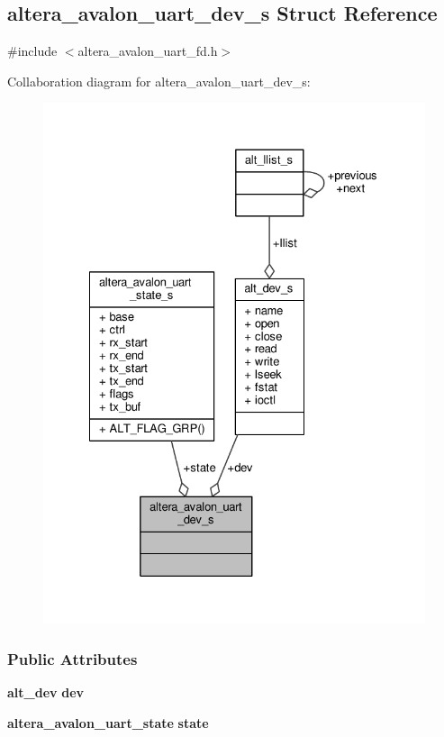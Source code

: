 \subsection{altera\+\_\+avalon\+\_\+uart\+\_\+dev\+\_\+s Struct Reference}
\label{structaltera__avalon__uart__dev__s}


{\ttfamily \#include $<$altera\+\_\+avalon\+\_\+uart\+\_\+fd.\+h$>$}



Collaboration diagram for altera\+\_\+avalon\+\_\+uart\+\_\+dev\+\_\+s\+:
\nopagebreak
\begin{figure}[H]
\begin{center}
\leavevmode
\includegraphics[width=328pt]{d6/dbf/structaltera__avalon__uart__dev__s__coll__graph}
\end{center}
\end{figure}
\subsubsection*{Public Attributes}
\begin{DoxyCompactItemize}
\item 
{\bf alt\+\_\+dev} {\bf dev}
\item 
{\bf altera\+\_\+avalon\+\_\+uart\+\_\+state} {\bf state}
\end{DoxyCompactItemize}



